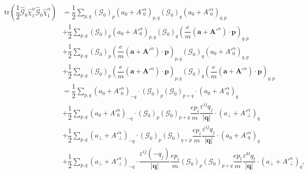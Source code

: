 \documentclass[bachelor,english,numbers]{ustcthesis}
\begin{document}
		\begin{align}
			\mathrm{tr}\left(\dfrac{1}{2}\hat{\mathcal{G}}_0\hat{\chi}^\alpha_1\hat{\mathcal{G}}_0\hat{\chi}^\alpha_1\right)&=\dfrac{1}{2}\sum_{p,q}(\mathcal{G}_0)_p (a_0+{A'}^\alpha_0)_{p,q} (\mathcal{G}_0)_q (a_0+{A'}^\alpha_0)_{q,p}\nonumber\\
			&+\dfrac{1}{2}\sum_{p,q}(\mathcal{G}_0)_{p}(a_0+{A'}_0^\alpha)_{p,q}(\mathcal{G}_0)_{q} \left(\dfrac{e}{m}(\bm{a}+\bm{A'}^\alpha)\cdot\bm{p}\right)_{q,p}\nonumber\\
			&+\dfrac{1}{2}\sum_{p,q}(\mathcal{G}_0)_{p}\left(\dfrac{e}{m}(\bm{a}+\bm{A'}^\alpha)\cdot\bm{p}\right)_{p,q}(\mathcal{G}_0)_{q}(a_0+{A'}^\alpha_0)_{q,p}\nonumber\\
			&+\dfrac{1}{2}\sum_{p,q}(\mathcal{G}_0)_{p}\left(\dfrac{e}{m}(\bm{a}+\bm{A'}^\alpha)\cdot\bm{p}\right)_{p,q}(\mathcal{G}_0)_{q}\left(\dfrac{e}{m}(\bm{a}+\bm{A'}^\alpha)\cdot\bm{p}\right)_{q,p}\nonumber\\
			&=\dfrac{1}{2}\sum_{p,q}(a_0+{A'}^\alpha_0)_{-q}\cdot(\mathcal{G}_0)_p(\mathcal{G}_0)_{p+q}\cdot(a_0+{A'}^\alpha_0)_{q}\nonumber\\
			&+\dfrac{1}{2}\sum_{p,q}(a_0+{A'}^\alpha_0)_{-q}\cdot(\mathcal{G}_0)_p (\mathcal{G}_0)_{p+q}\dfrac{ep_i}{m}\dfrac{\varepsilon^{ij}q_j}{|\bm{q}|}\cdot(a_\perp+{A'}^\alpha_\perp)_{q}\nonumber\\
			&+\dfrac{1}{2}\sum_{p,q}(a_\perp+{A'}^\alpha_\perp)_{-q}\cdot(\mathcal{G}_0)_p (\mathcal{G}_0)_{q+p}\dfrac{ep_i}{m}\dfrac{\varepsilon^{ij}q_j}{|\bm{q}|}\cdot(a_0+{A'}^\alpha_0)_{q}\nonumber\\
			&+\dfrac{1}{2}\sum_{p,q}(a_\perp+{A'}^\alpha_\perp)_{-q}\cdot\dfrac{\varepsilon^{ij}(-q_j)}{|\bm{q}|}\dfrac{ep_i}{m}(\mathcal{G}_0)_{p}(\mathcal{G}_0)_{p+q}\dfrac{ep_l}{m}\dfrac{\varepsilon^{kl}q_l}{|\bm{q}|}\cdot(a_\perp+{A'}^\alpha_\perp)_{q},\label{2.4.7}
		\end{align}
\end{document}
